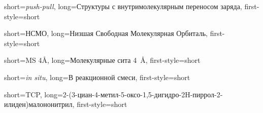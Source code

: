 {
    short={\emph{push-pull}},
    long={Структуры с внутримолекулярным переносом заряда},
    first-style=short
}

{
    short={НСМО},
    long={Низшая Свободная Молекулярная Орбиталь},
    first-style=short
}

{
    short={MS 4Å},
    long={Молекулярные сита \SI{4}{\angstrom}},
    first-style=short
}

{
    short={\emph{in situ}},
    long={В реакционной смеси},
    first-style=short
}

{
    short={TCP},
    long={2-(3-циан-4-метил-5-оксо-1,5-дигидро-2H-пиррол-2-илиден)малононитрил},
    first-style=short
}